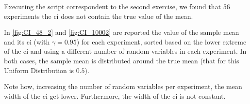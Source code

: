 \documentclass[11pt,a4paper]{article}
\begin{document}
Executing the script correspondent to the second exercise, we found that 56 experiments the \gls{ci} does not contain the true value of the mean.

In \autoref{fig:CI_48_2} and \autoref{fig:CI_10002} are reported the value of the sample mean and its \gls{ci} (with $\gamma=0.95$) for each experiment, sorted based on the lower extreme of the \gls{ci} and using a different number of random variables in each experiment.
In both cases, the sample mean is distributed around the true mean (that for this Uniform Distribution is $0.5$).

Note how, increasing the number of random variables per experiment, the mean width of the \gls{ci} get lower. Furthermore, the width of the \gls{ci} is not constant.

\section{}
\section{}
\end{document}
